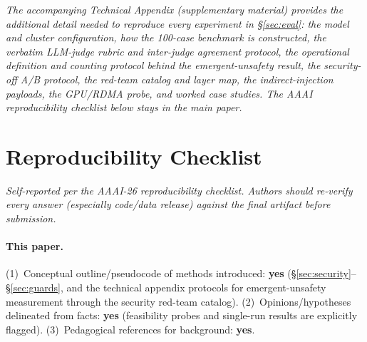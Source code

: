 \documentclass[letterpaper]{article}
\begin{document}


\clearpage
\appendix

\noindent\textit{The accompanying \emph{Technical Appendix} (supplementary material) provides the additional detail needed to reproduce every experiment in \S\ref{sec:eval}: the model and cluster configuration, how the 100-case benchmark is constructed, the verbatim LLM-judge rubric and inter-judge agreement protocol, the operational definition and counting protocol behind the emergent-unsafety result, the security-off A/B protocol, the red-team catalog and layer map, the indirect-injection payloads, the GPU/RDMA probe, and worked case studies. The AAAI reproducibility checklist below stays in the main paper.}

\section{Reproducibility Checklist}
\label{app:checklist}

\noindent\textit{Self-reported per the AAAI-26 reproducibility checklist. Authors should re-verify every answer (especially code/data release) against the final artifact before submission.}

\paragraph{This paper.}
(1)~Conceptual outline/pseudocode of methods introduced: \textbf{yes} (\S\ref{sec:security}--\S\ref{sec:guards}, and the technical appendix protocols for emergent-unsafety measurement through the security red-team catalog).
(2)~Opinions/hypotheses delineated from facts: \textbf{yes} (feasibility probes and single-run results are explicitly flagged).
(3)~Pedagogical references for background: \textbf{yes}.
\end{document}
